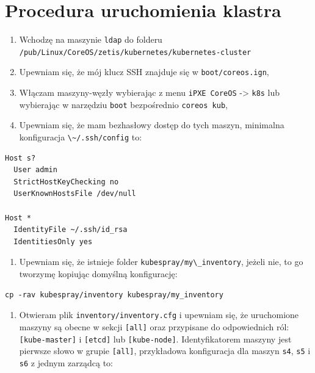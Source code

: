 \documentclass[a4paper,12pt,twoside,openany]{report}
\providecommand{\tightlist}{%
  \setlength{\itemsep}{0pt}\setlength{\parskip}{0pt}}
\newcommand{\passthrough}[1]{#1}
\begin{document}
\hypertarget{procedura-uruchomienia-klastra}{%
\section{Procedura uruchomienia
klastra}\label{procedura-uruchomienia-klastra}}

\begin{enumerate}
\def\labelenumi{\arabic{enumi}.}
\tightlist
\item
  Wchodzę na maszynie \passthrough{\lstinline!ldap!} do folderu
  \passthrough{\lstinline!/pub/Linux/CoreOS/zetis/kubernetes/kubernetes-cluster!}
\item
  Upewniam się, że mój klucz SSH znajduje się w
  \passthrough{\lstinline!boot/coreos.ign!},
\item
  Włączam maszyny-węzły wybierając z menu
  \passthrough{\lstinline!iPXE CoreOS!} -\textgreater{}
  \passthrough{\lstinline!k8s!} lub wybierając w narzędziu
  \passthrough{\lstinline!boot!} bezpośrednio
  \passthrough{\lstinline!coreos kub!},
\item
  Upewniam się, że mam bezhasłowy dostęp do tych maszyn, minimalna
  konfiguracja \passthrough{\lstinline!\~/.ssh/config!} to:
\end{enumerate}

\begin{lstlisting}
Host s?
  User admin
  StrictHostKeyChecking no
  UserKnownHostsFile /dev/null

Host *
  IdentityFile ~/.ssh/id_rsa
  IdentitiesOnly yes
\end{lstlisting}

\begin{enumerate}
\def\labelenumi{\arabic{enumi}.}
\setcounter{enumi}{4}
\tightlist
\item
  Upewniam się, że istnieje folder
  \passthrough{\lstinline!kubespray/my\_inventory!}, jeżeli nie, to go
  tworzymę kopiując domyślną konfigurację:
\end{enumerate}

\begin{lstlisting}
cp -rav kubespray/inventory kubespray/my_inventory
\end{lstlisting}

\begin{enumerate}
\def\labelenumi{\arabic{enumi}.}
\setcounter{enumi}{5}
\tightlist
\item
  Otwieram plik \passthrough{\lstinline!inventory/inventory.cfg!} i
  upewniam się, że uruchomione maszyny są obecne w sekcji
  \passthrough{\lstinline![all]!} oraz przypisane do odpowiednich ról:
  \passthrough{\lstinline![kube-master]!} i
  \passthrough{\lstinline![etcd]!} lub
  \passthrough{\lstinline![kube-node]!}. Identyfikatorem maszyny jest
  pierwsze słowo w grupie \passthrough{\lstinline![all]!}, przykładowa
  konfiguracja dla maszyn \passthrough{\lstinline!s4!},
  \passthrough{\lstinline!s5!} i \passthrough{\lstinline!s6!} z jednym
  zarządcą to:
\end{enumerate}
\end{document}
